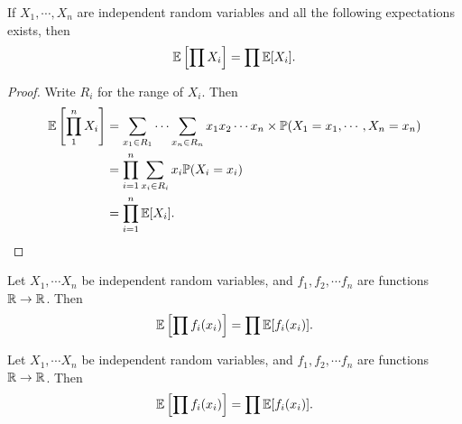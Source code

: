 %
\begin{note}
  \begin{field}
    \begin{thm}
      If $X_1, \cdots, X_n$ are independent random variables and all the following expectations exists, then
      \[
        \mathbb{E}\left[\prod X_i\right] = \prod \mathbb{E}[X_i].
      \]
    \end{thm}
  \end{field}
  \begin{field}
    \begin{proof}
      Write $R_i$ for the range of $X_i$. Then
      \begin{align*}
        \mathbb{E}\left[\prod_1^n X_i\right] &= \sum_{x_1\in R_1}\cdots \sum_{x_n\in R_n}x_1x_2\cdots x_n\times \mathbb{P}(X_1 = x_1, \cdots, X_n = x_n)\\
        &= \prod_{i = 1}^n \sum_{x_i \in R_i}x_i\mathbb{P}(X_i = x_i)\\
        &= \prod_{i = 1}^n \mathbb{E}[X_i].\qedhere
      \end{align*}
    \end{proof}
  \end{field}
  \xplain{}%
\end{note}

\begin{note}
  \begin{field}
    \begin{cor}
      Let $X_1,\cdots X_n$ be independent random variables, and $f_1, f_2, \cdots f_n$ are functions $\mathbb{R}\to \mathbb{R}$. Then
      \[
        \mathbb{E}\left[\prod f_i(x_i)\right] = \prod \mathbb{E}[f_i(x_i)].
      \]
    \end{cor}
  \end{field}
  \begin{field}
    \begin{cor}
      Let $X_1,\cdots X_n$ be independent random variables, and $f_1, f_2, \cdots f_n$ are functions $\mathbb{R}\to \mathbb{R}$. Then
      \[
        \mathbb{E}\left[\prod f_i(x_i)\right] = \prod \mathbb{E}[f_i(x_i)].
      \]
    \end{cor}
  \end{field}
  \xplain{}%
\end{note}

